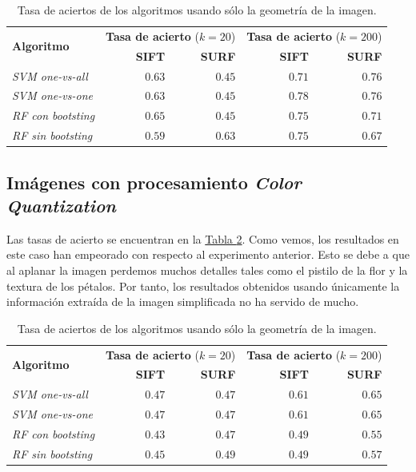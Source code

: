 \documentclass[paper=a4, fontsize=11pt]{article} %
\numberwithin{equation}{section} %
\numberwithin{figure}{section} %
\numberwithin{table}{section} %
\begin{document}
\begin{table}[H]
  \begin{tabular}{l|r|r||r|r}
    \multirow{2}{*}{\textbf{Algoritmo}} & \multicolumn{2}{c}{\textbf{Tasa de acierto} ($k=20$)} & \multicolumn{2}{c}{\textbf{Tasa de acierto} ($k=200$)} \\
    \cline{2-5}
    & \textbf{SIFT} & \textbf{SURF} & \textbf{SIFT} & \textbf{SURF} \\
    \hline
    \textit{SVM one-vs-all} & $\qquad 0.63$ & $\qquad 0.45$ & $\qquad 0.71$ & $\qquad 0.76$ \\ 
    \textit{SVM one-vs-one} & $\qquad 0.63$ & $\qquad 0.45$ & $\qquad 0.78$ & $\qquad 0.76$ \\
    \textit{RF con bootsting} & $\qquad 0.65$ & $\qquad 0.45$ & $\qquad 0.75$ & $\qquad 0.71$ \\
    \textit{RF sin bootsting} & $\qquad 0.59$ & $\qquad 0.63$ & $\qquad 0.75$ & $\qquad 0.67$ \\
  \end{tabular}
  \label{resSHAPE}
  \caption{Tasa de aciertos de los algoritmos usando sólo la geometría de la imagen.}
\end{table}

\subsection{Imágenes con procesamiento \textit{Color Quantization}}

Las tasas de acierto se encuentran en la \hyperref[resColor]{Tabla \ref*{resColor}}. Como vemos, los resultados en este caso han empeorado con respecto al experimento anterior. Esto se debe a que al aplanar la imagen perdemos muchos detalles tales como el pistilo de la flor y la textura de los pétalos.  Por tanto, los resultados obtenidos usando únicamente la información extraída de la imagen simplificada no ha servido de mucho.

\begin{table}[H]
  \begin{tabular}{l|r|r||r|r}
    \multirow{2}{*}{\textbf{Algoritmo}} & \multicolumn{2}{c}{\textbf{Tasa de acierto} ($k=20$)} & \multicolumn{2}{c}{\textbf{Tasa de acierto} ($k=200$)} \\
    \cline{2-5}
    & \textbf{SIFT} & \textbf{SURF} & \textbf{SIFT} & \textbf{SURF} \\
    \hline
    \textit{SVM one-vs-all} & $\qquad 0.47$ & $\qquad 0.47$ & $\qquad 0.61$ & $\qquad 0.65$ \\ 
    \textit{SVM one-vs-one} & $\qquad 0.47$ & $\qquad 0.47$ & $\qquad 0.61$ & $\qquad 0.65$ \\
    \textit{RF con bootsting} & $\qquad 0.43$ & $\qquad 0.47$ & $\qquad 0.49$ & $\qquad 0.55$ \\
    \textit{RF sin bootsting} & $\qquad 0.45$ & $\qquad 0.49$ & $\qquad 0.49$ & $\qquad 0.57$ \\
  \end{tabular}
  \label{resColor}
  \caption{Tasa de aciertos de los algoritmos usando sólo la geometría de la imagen.}
\end{table}
\end{document}
